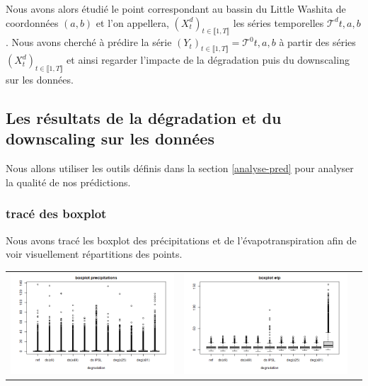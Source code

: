 \documentclass[a4paper,10pt]{article}
\begin{document}
	Nous avons alors étudié le point correspondant au bassin du Little Washita de coordonnées $(a,b)$ et l'on appellera, $(X^d_t)_{t\in \llbracket 1,T \rrbracket}$ les séries temporelles $\mathcal{T}^{d}{t,a,b}$. Nous avons cherché à prédire la série $(Y_t)_{t \in \llbracket 1,T \rrbracket}= \mathcal{T}^{0}{t,a,b}$ à partir des séries $(X^d_t)_{t\in \llbracket 1,T \rrbracket}$ et ainsi regarder l'impacte de la dégradation puis du downscaling sur les données.
	
	\subsection{Les résultats de la dégradation et du downscaling sur les données}
	Nous allons utiliser les outils définis dans la section \ref{analyse-pred} pour analyser la qualité de nos prédictions.
	
	\subsubsection{tracé des boxplot}
	
	Nous avons tracé les boxplot des précipitations et de l'évapotranspiration afin de voir visuellement répartitions des points.
	
	
	\hspace{-1cm}
	\begin{tabular}{ccc}
		\includegraphics[scale=0.4]{images/boxplot_precip.png} & \includegraphics[scale=0.4]{images/boxplot_evap.png}   \\
	\end{tabular} 
	
\end{document}

